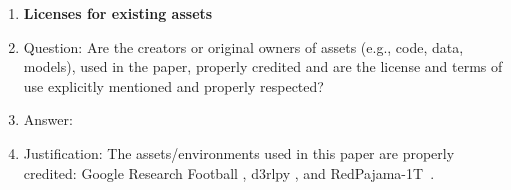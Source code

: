 \begin{enumerate}
\item {\bf Licenses for existing assets}
    \item[] Question: Are the creators or original owners of assets (e.g., code, data, models), used in the paper, properly credited and are the license and terms of use explicitly mentioned and properly respected?
    \item[] Answer: \answerYes{} %
    \item[] Justification:  The assets/environments used in this paper are properly credited: Google Research Football \cite{kurach2020google}, d3rlpy \cite{d3rlpy}, and RedPajama-1T~\citep{redpajama@2023together}.


\end{enumerate}
